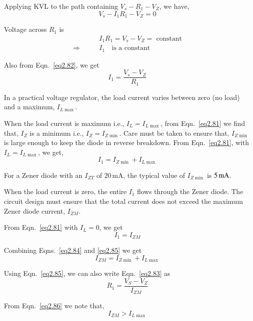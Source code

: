 Applying KVL to the path containing $V_{s}-R_{1}-V_{Z}$, we have,
\begin{equation}
V_{s}-I_{1}R_{1}-V_{Z}=0\label{eq2.82}
\end{equation}

Voltage across $R_{1}$ is
\begin{align*}
& I_{1}R_{1}=V_{s}-V_{Z}=\text{~constant}\\[3pt]
\Rightarrow\qquad & I_{1}\text{~~ is a constant}
\end{align*}

Also from Eqn.~\eqref{eq2.82}, we get
\begin{equation}
I_{1}=\frac{V_{s}-V_{Z}}{R_{1}}\label{eq2.83}
\end{equation}

In a practical voltage regulator, the load current varies between zero (no load) and a maximum, $I_{L\max}$.

When the load current is maximum i.e., $I_{L}=I_{L\max}$, from Eqn.~\eqref{eq2.81} we find that, $I_{Z}$ is a minimum i.e., $I_{Z}=I_{Z\min}$. Care must be taken to ensure that, $I_{Z\min}$ is large enough to keep the diode in reverse breakdown. From Eqn.~\eqref{eq2.81}, with $I_{L}=I_{L\max}$, we get,
\begin{equation}
I_{1}=I_{Z\min}+I_{L\max}\label{eq2.84}
\end{equation}

For a Zener diode with an $I_{ZT}$ of $20\,\text{mA}$, the typical value of $I_{Z\min}$ is $5\text{\,mA}$.

When the load current is zero, the entire $I_{1}$ flows through the Zener diode. The circuit design must ensure that the total current does not exceed the maximum Zener diode current, $I_{ZM}$.

From Eqn.~\eqref{eq2.81} with $I_{L}=0$, we get
\begin{equation}
I_{1}=I_{ZM}\label{eq2.85}
\end{equation}

Combining Eqns.~\eqref{eq2.84} and \eqref{eq2.85} we get
\begin{equation}
I_{ZM}=I_{Z\min}+I_{L\max}\label{eq2.86}
\end{equation}

Using Eqn.~\eqref{eq2.85}, we can also write Eqn.~\eqref{eq2.83} as
\begin{equation}
R_{1}=\frac{V_{S}-V_{Z}}{I_{ZM}}\label{eq2.87}
\end{equation}

From Eqn.~\eqref{eq2.86} we note that,
$$
I_{ZM}>I_{L\max}
$$

